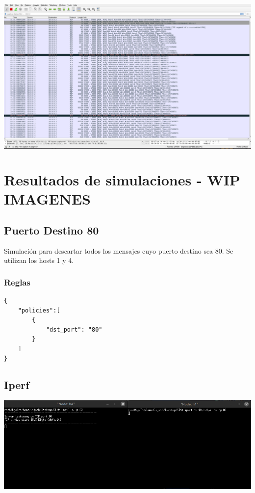 \documentclass{article}
\begin{document}
\begin{center}
\includegraphics[scale=0.2]{iperfTCP.png}

\end{center}

\section{Resultados de simulaciones - WIP IMAGENES}\label{pruebas-wip}

\subsection{Puerto Destino 80}
Simulación para descartar todos los mensajes cuyo puerto destino sea 80. Se utilizan los hosts 1 y 4. 

\subsubsection{Reglas}
\begin{verbatim}
{
    "policies":[
        {
            "dst_port": "80"
        }
    ]
}
\end{verbatim}

\subsection{Iperf}
\begin{center}
\includegraphics[scale=0.35]{iperf_port_80.png}
\end{center}
\end{document}
